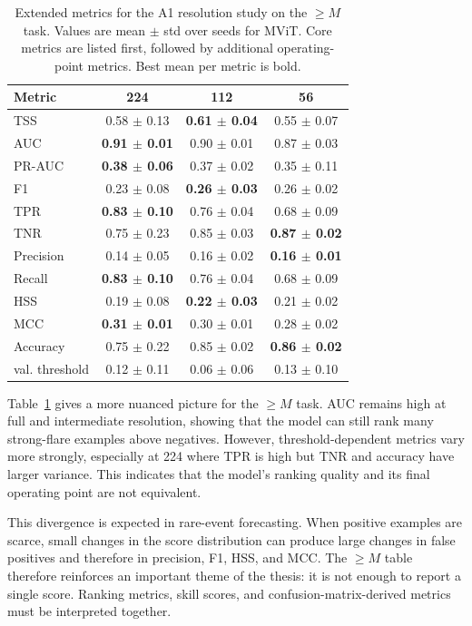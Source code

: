 \begin{table}[!htbp]
\centering
\footnotesize
\setlength{\tabcolsep}{4pt}
\caption{Extended metrics for the A1 resolution study on the $\geq M$ task. Values are mean $\pm$ std over seeds for MViT. Core metrics are listed first, followed by additional operating-point metrics. Best mean per metric is bold.}
\label{tab:appendix_res_m}
\begin{tabular}{lccc}
\toprule
Metric & 224 & 112 & 56 \\
\midrule
TSS & 0.58 $\pm$ 0.13 & \textbf{0.61 $\pm$ 0.04} & 0.55 $\pm$ 0.07 \\
AUC & \textbf{0.91 $\pm$ 0.01} & 0.90 $\pm$ 0.01 & 0.87 $\pm$ 0.03 \\
PR-AUC & \textbf{0.38 $\pm$ 0.06} & 0.37 $\pm$ 0.02 & 0.35 $\pm$ 0.11 \\
F1 & 0.23 $\pm$ 0.08 & \textbf{0.26 $\pm$ 0.03} & 0.26 $\pm$ 0.02 \\
TPR & \textbf{0.83 $\pm$ 0.10} & 0.76 $\pm$ 0.04 & 0.68 $\pm$ 0.09 \\
TNR & 0.75 $\pm$ 0.23 & 0.85 $\pm$ 0.03 & \textbf{0.87 $\pm$ 0.02} \\
Precision & 0.14 $\pm$ 0.05 & 0.16 $\pm$ 0.02 & \textbf{0.16 $\pm$ 0.01} \\
Recall & \textbf{0.83 $\pm$ 0.10} & 0.76 $\pm$ 0.04 & 0.68 $\pm$ 0.09 \\
HSS & 0.19 $\pm$ 0.08 & \textbf{0.22 $\pm$ 0.03} & 0.21 $\pm$ 0.02 \\
MCC & \textbf{0.31 $\pm$ 0.01} & 0.30 $\pm$ 0.01 & 0.28 $\pm$ 0.02 \\
Accuracy & 0.75 $\pm$ 0.22 & 0.85 $\pm$ 0.02 & \textbf{0.86 $\pm$ 0.02} \\
val. threshold & 0.12 $\pm$ 0.11 & 0.06 $\pm$ 0.06 & 0.13 $\pm$ 0.10 \\
\bottomrule
\end{tabular}
\end{table}

\FloatBarrier

Table~\ref{tab:appendix_res_m} gives a more nuanced picture for the $\geq M$ task. AUC remains high at full and intermediate resolution, showing that the model can still rank many strong-flare examples above negatives. However, threshold-dependent metrics vary more strongly, especially at 224 where TPR is high but TNR and accuracy have larger variance. This indicates that the model's ranking quality and its final operating point are not equivalent.

This divergence is expected in rare-event forecasting. When positive examples are scarce, small changes in the score distribution can produce large changes in false positives and therefore in precision, F1, HSS, and MCC. The $\geq M$ table therefore reinforces an important theme of the thesis: it is not enough to report a single score. Ranking metrics, skill scores, and confusion-matrix-derived metrics must be interpreted together.

